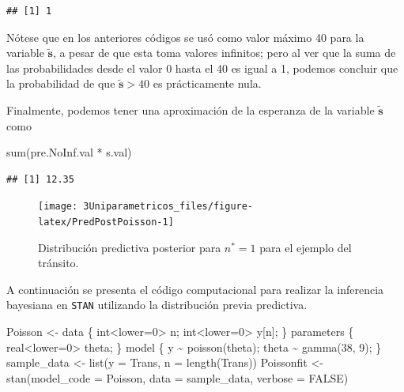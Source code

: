 \documentclass[
  10pt,
  spanish,
]{book}
\newenvironment{Shaded}{\begin{snugshade}}{\end{snugshade}}
\newcommand{\AttributeTok}[1]{\textcolor[rgb]{0.77,0.63,0.00}{#1}}
\newcommand{\ConstantTok}[1]{\textcolor[rgb]{0.00,0.00,0.00}{#1}}
\newcommand{\FunctionTok}[1]{\textcolor[rgb]{0.00,0.00,0.00}{#1}}
\newcommand{\NormalTok}[1]{#1}
\newcommand{\OtherTok}[1]{\textcolor[rgb]{0.56,0.35,0.01}{#1}}
\newcommand{\SpecialCharTok}[1]{\textcolor[rgb]{0.00,0.00,0.00}{#1}}
\newcommand{\StringTok}[1]{\textcolor[rgb]{0.31,0.60,0.02}{#1}}
\theoremstyle{definition}
\theoremstyle{definition}
\theoremstyle{definition}
\theoremstyle{definition}
\theoremstyle{remark}
\begin{document}
\begin{verbatim}
## [1] 1
\end{verbatim}

Nótese que en los anteriores códigos se usó como valor máximo 40 para la variable \(\mathbf{\tilde{s}}\), a pesar de que esta toma valores infinitos; pero al ver que la suma de las probabilidades desde el valor 0 hasta el 40 es igual a 1, podemos concluir que la probabilidad de que \(\mathbf{\tilde{s}} > 40\) es prácticamente nula.

Finalmente, podemos tener una aproximación de la esperanza de la variable \(\mathbf{\tilde{s}}\) como

\begin{Shaded}
\begin{Highlighting}[]
\FunctionTok{sum}\NormalTok{(pre.NoInf.val }\SpecialCharTok{*}\NormalTok{ s.val)}
\end{Highlighting}
\end{Shaded}

\begin{verbatim}
## [1] 12.35
\end{verbatim}

\begin{figure}

{\centering \texttt{[image: 3Uniparametricos\_files/figure-latex/PredPostPoisson-1]} 

}

\caption{Distribución predictiva posterior para $n^*=1$ para el ejemplo del tránsito.}\label{fig:PredPostPoisson}
\end{figure}

A continuación se presenta el código computacional para realizar la inferencia bayesiana en \texttt{STAN} utilizando la distribución previa predictiva.

\begin{Shaded}
\begin{Highlighting}[]
\NormalTok{Poisson }\OtherTok{\textless{}{-}} \StringTok{\textquotesingle{}}
\StringTok{data \{}
\StringTok{  int\textless{}lower=0\textgreater{} n;}
\StringTok{  int\textless{}lower=0\textgreater{} y[n];}
\StringTok{\}}
\StringTok{parameters \{}
\StringTok{  real\textless{}lower=0\textgreater{} theta;}
\StringTok{\}}
\StringTok{model \{}
\StringTok{  y \textasciitilde{} poisson(theta);}
\StringTok{  theta \textasciitilde{} gamma(38, 9);}
\StringTok{\}}
\StringTok{\textquotesingle{}}
\NormalTok{sample\_data }\OtherTok{\textless{}{-}} \FunctionTok{list}\NormalTok{(}\AttributeTok{y =}\NormalTok{ Trans, }\AttributeTok{n =} \FunctionTok{length}\NormalTok{(Trans))}
\NormalTok{Poissonfit }\OtherTok{\textless{}{-}} \FunctionTok{stan}\NormalTok{(}\AttributeTok{model\_code =}\NormalTok{ Poisson,}
               \AttributeTok{data =}\NormalTok{ sample\_data, }\AttributeTok{verbose =} \ConstantTok{FALSE}\NormalTok{)}
\end{Highlighting}
\end{Shaded}
\end{document}
